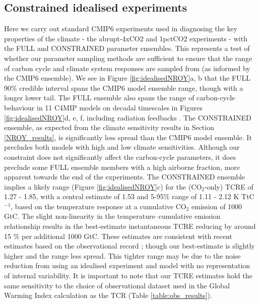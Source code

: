 \documentclass[gmd, manuscript]{copernicus}
\begin{document}
\subsection{Constrained idealised experiments} \label{NROY_idealised}
Here we carry out standard CMIP6 experiments used in diagnosing the key properties of the climate - the abrupt-4xCO2 and 1pctCO2 experiments - with the FULL and CONSTRAINED parameter ensembles. This represents a test of whether our parameter sampling methods are sufficient to ensure that the range of carbon cycle and climate system responses are sampled from (as informed by the CMIP6 ensemble). We see in Figure \ref{fig:idealisedNROY}a, b that the FULL 90\% credible interval spans the CMIP6 model ensemble range, though with a longer lower tail. The FULL ensemble also spans the range of carbon-cycle behaviour in 11 C4MIP models on decadal timescales in Figures \ref{fig:idealisedNROY}d, e, f, including radiation feedbacks \citep[Figure \ref{fig:idealisedNROY}g]{K.Arora2020}. The CONSTRAINED ensemble, as expected from the climate sensitivity results in Section \ref{NROY_results}, is significantly less spread than the CMIP6 model ensemble. It precludes both models with high and low climate sensitivities. Although our constraint does not significantly affect the carbon-cycle parameters, it does preclude some FULL ensemble members with a high airborne fraction, more apparent towards the end of the experiments. The CONSTRAINED ensemble implies a likely range (Figure \ref{fig:idealisedNROY}c) for the (CO$_2$-only) TCRE \citep{Matthews2009a,Allen2009,Zickfeld2016,MacDougall2016} of 1.27 - 1.85, with a central estimate of 1.53 and 5-95\% range of 1.11 - 2.12 K TtC$^{-1}$, based on the temperature response at a cumulative CO$_2$ emission of 1000 GtC. The slight non-linearity in the temperature--cumulative emission relationship results in the best-estimate instantaneous TCRE reducing by around 15 \% per additional 1000 GtC. These estimates are consistent with recent estimates based on the observational record \citep{Millar20160449,Gillett2013}; though our best-estimate is slightly higher and the range less spread. This tighter range may be due to the noise reduction from using an idealised experiment and model with no representation of internal variability. It is important to note that our TCRE estimates hold the same sensitivity to the choice of observational dataset used in the Global Warming Index calculation as the TCR (Table \ref{table:obs_results}). 
%
\clearpage
\end{document}
